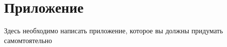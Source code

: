 \section*{Приложение}
\label{sec:Apendix} 

Здесь необходимо написать приложение, которое вы должны придумать самомтоятельно